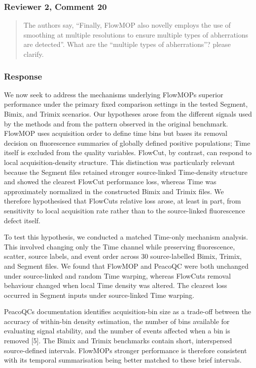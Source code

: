 \documentclass[
  11pt,
  a4paper,
]{article}
\begin{document}
\subsubsection{Reviewer 2, Comment 20}\label{reviewer-2-comment-20}

\begin{quote}
The authors say, ``Finally, FlowMOP also novelly employs the use of
smoothing at multiple resolutions to ensure multiple types of
abherrations are detected''. What are the ``multiple types of
abherrations''? please clarify.
\end{quote}

\subsubsection{Response}\label{response-3}

We now seek to address the mechanisms underlying
FlowMOP\textquotesingle s superior performance under the primary fixed
comparison settings in the tested Segment, Bimix, and Trimix scenarios.
Our hypotheses arose from the different signals used by the methods and
from the pattern observed in the original benchmark. FlowMOP uses
acquisition order to define time bins but bases its removal decision on
fluorescence summaries of globally defined positive populations; Time
itself is excluded from the quality variables. FlowCut, by contrast, can
respond to local acquisition-density structure. This distinction was
particularly relevant because the Segment files retained stronger
source-linked Time-density structure and showed the clearest FlowCut
performance loss, whereas Time was approximately normalized in the
constructed Bimix and Trimix files. We therefore hypothesised that
FlowCut\textquotesingle s relative loss arose, at least in part, from
sensitivity to local acquisition rate rather than to the source-linked
fluorescence defect itself.

To test this hypothesis, we conducted a matched Time-only mechanism
analysis. This involved changing only the Time channel while preserving
fluorescence, scatter, source labels, and event order across 30
source-labelled Bimix, Trimix, and Segment files. We found that FlowMOP
and PeacoQC were both unchanged under source-linked and random Time
warping, whereas FlowCut\textquotesingle s removal behaviour changed
when local Time density was altered. The clearest loss occurred in
Segment inputs under source-linked Time warping.

PeacoQC\textquotesingle s documentation identifies acquisition-bin size
as a trade-off between the accuracy of within-bin density estimation,
the number of bins available for evaluating signal stability, and the
number of events affected when a bin is removed {[}5{]}. The Bimix and
Trimix benchmarks contain short, interspersed source-defined intervals.
FlowMOP\textquotesingle s stronger performance is therefore consistent
with its temporal summarisation being better matched to these brief
intervals.
\end{document}
